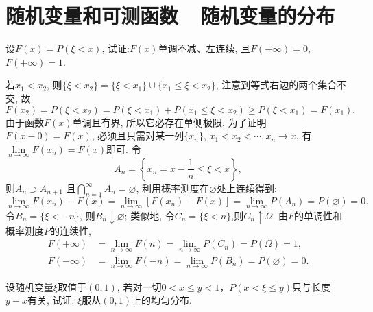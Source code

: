 \chapter{随机变量和可测函数~~随机变量的分布}

\begin{yyEx}
	设$F(x) = P(\xi<x)$, 试证:$F(x)$单调不减、左连续, 且$F(-\infty) = 0$, $F(+\infty) = 1$.
	
\end{yyEx}
\begin{yyProof}
	若$x_1<x_2$, 则$\{ \xi<x_2 \} = \{ \xi<x_1\}  \cup\{ x_1\leqslant\xi<x_2 \}$, 
	注意到等式右边的两个集合不交, 故
	\begin{equation}
	F(x_2) = P(\xi<x_2) = P(\xi<x_1)+P( x_1\leqslant\xi<x_2) \geqslant P(\xi<x_1) = F(x_1).
	\end{equation}
	由于函数$F(x)$单调且有界, 所以它必存在单侧极限. 为了证明$F(x-0)=F(x)$, 必须且只需对某一列$\{x_n\}$, $x_1<x_2<\cdots,x_n\to x$, 有$\lim\limits_{n\to\infty}F(x_n) = F(x)$即可. 令
	\begin{equation}
	A_n = \left\{ x_n = x-\frac{1}{n}\leqslant \xi < x \right\},
	\end{equation}
	则$A_n\supset A_{n+1}$ 且$\bigcap\limits_{n=1}^{\infty}A_n = \varnothing$, 利用概率测度在$\varnothing$处上连续得到:
	\begin{equation}
	\lim_{n\to\infty}F(x_n) - F(x) = \lim_{n\to\infty}[F(x_n) - F(x)] = \lim_{n\to\infty}P(A_n) = P(\varnothing) = 0.
	\end{equation}
	令$B_n = \{ \xi<-n \}$, 则$B_n\downarrow \varnothing$; 类似地, 令$C_n = \{\xi<n\}$,则$C_n\uparrow\Omega$.
	由$F$的单调性和概率测度$P$的连续性,
	\begin{align}
	F(+\infty) &= \lim_{n\to\infty}F(n) = \lim_{n\to\infty}P(C_n) = P(\Omega) = 1,\nonumber\\
	F(-\infty) &= \lim_{n\to\infty}F(-n) = \lim_{n\to\infty}P(B_n) =  P(\varnothing) = 0.
	\end{align}
\end{yyProof}

\begin{yyEx}
	设随机变量$\xi$取值于$(0,1)$, 若对一切$0<x\leqslant y<1$，$P(x<\xi\leqslant y)$只与长度$y-x$有关, 试证:
	$\xi$服从$(0,1)$上的均匀分布.
\end{yyEx}

